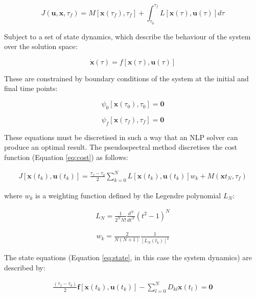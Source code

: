 \begin{equation} \label{eq:cost}
J(\textbf{u},\textbf{x},\tau_f) = M[\textbf{x}(\tau_f),\tau_f] +   \int_{\tau_0}^{\tau_f} L[\textbf{x}(\tau),\textbf{u}(\tau)] d\tau
\end{equation}

Subject to a set of state dynamics, which describe the behaviour of the system over the solution space: 

\begin{equation} \label{eq:state}
\dot{\textbf{x}}(\tau) = f[\textbf{x}(\tau),\textbf{u}(\tau)]
\end{equation}

These are constrained by boundary conditions of the system at the initial and final time points:

\begin{equation}
\psi_0[\textbf{x}(\tau_0), \tau_0] = \textbf{0}
\end{equation}

\begin{equation} \label{eq:2}
\psi_f[\textbf{x}(\tau_f), \tau_f] = \textbf{0}
\end{equation}

These equations must be discretised in such a way that an NLP solver can produce an optimal result. The pseudospectral method discretises the cost function (Equation \ref{eq:cost}) as follows:

\begin{eqnarray}
J[\textbf{x}(t_k),\textbf{u}(t_k)] = \frac{\tau_f - \tau_0}{2} \sum_{k=0}^{N}L[\textbf{x}(t_k),\textbf{u}(t_k)]w_k + M(\textbf{x}t_N,\tau_f)
\end{eqnarray}

where $ w_k $ is a weighting function defined by the Legendre polynomial $L_N$:

\begin{eqnarray}
L_N = \frac{1}{2^N N!} \frac{d^N}{dt^N}(t^2-1)^N
\end{eqnarray}

\begin{eqnarray}
w_k = \frac{2}{N(N+1)} \frac{1}{[L_N(t_k)]^2}
\end{eqnarray}

The state equations (Equation \ref{eq:state}, in this case the system dynamics) are described by:

\begin{eqnarray}
\frac{(\tau_f - \tau_0)}{2}\textbf{f}[\textbf{x}(t_k),\textbf{u}(t_k)] - \sum_{l=0}^{N} D_{kl} \textbf{x}(t_l) = \textbf{0}
\end{eqnarray}

